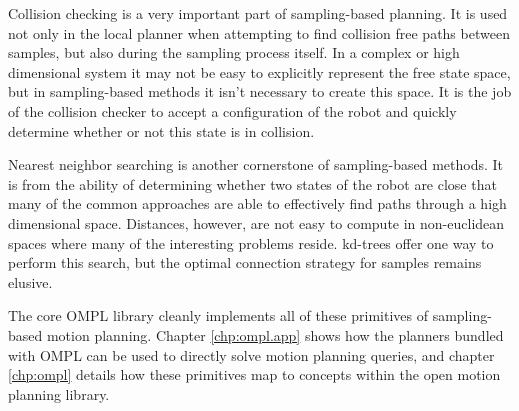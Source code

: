 Collision checking is a very important part of sampling-based planning.  It is 
used not only in the local planner when attempting to find collision free paths
between samples, but also during the sampling process itself.  In a complex or
high dimensional system it may not be easy to explicitly represent the free 
state space, but in sampling-based methods it isn't necessary to create this 
space.  It is the job of the collision checker to accept a configuration of the
robot and quickly determine whether or not this state is in collision.

Nearest neighbor searching is another cornerstone of sampling-based methods.  
It is from the ability of determining whether two states of the robot are close
that many of the common approaches are able to effectively find paths through a
high dimensional space.  Distances, however, are not easy to compute in 
non-euclidean spaces where many of the interesting problems reside.  kd-trees
offer one way to perform this search, but the optimal connection strategy for
samples remains elusive.

The core OMPL library cleanly implements all of these primitives of 
sampling-based motion planning.  Chapter \ref{chp:ompl.app} shows how the
planners bundled with OMPL can be used to directly solve motion planning
queries, and chapter \ref{chp:ompl} details how these primitives map to concepts
within the open motion planning library.

